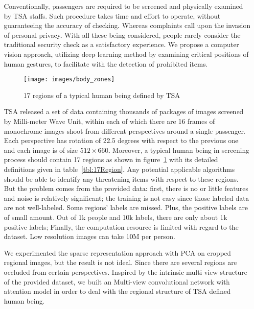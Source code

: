 \documentclass[conference,compsoc]{IEEEtran}
\begin{document}
Conventionally, passengers are required to be screened and physically examined by TSA staffs. Such procedure takes time and effort to operate, without guaranteeing the accuracy of checking. Whereas complaints call upon the invasion of personal privacy. With all these being considered, people rarely consider the traditional security check as a satisfactory experience. We propose a computer vision approach, utilizing deep learning method by examining critical positions of human gestures, to facilitate with the detection of prohibited items.
\begin{figure}[!tp]
\texttt{[image: images/body\_zones]}
\caption{17 regions of a typical human being defined by TSA}
\label{fig:17Region}
\end{figure}

TSA released a set of data containing thousands of packages of images screened by Milli-meter Wave Unit, within each of which there are 16 frames of monochrome images shoot from different perspectives around a single passenger. Each perspective has rotation of 22.5 degrees with respect to the previous one and each image is of size $512\times660$. Moreover, a typical human being in screening process should contain 17 regions as shown in figure~\ref{fig:17Region} with its detailed definitions given in table~\ref{tbl:17Region}. Any potential applicable algorithms should be able to identify any threatening items with respect to these regions. But the problem comes from the provided data: first, there is no or little features and noise is relatively significant; the training is not easy since those labeled data are not well-labeled. Some regions' labels are missed. Plus, the positive labels are of small amount. Out of 1k people and 10k labels, there are only about 1k positive labels; Finally, the computation resource is limited with regard to the dataset. Low resolution images can take 10M per person.

We experimented the sparse representation approach with PCA on cropped regional images, but the result is not ideal. Since there are several regions are occluded from certain perspectives. Inspired by the intrinsic multi-view structure of the provided dataset, we built an Multi-view convolutional network with attention model in order to deal with the regional structure of TSA defined human being.
\end{document}
